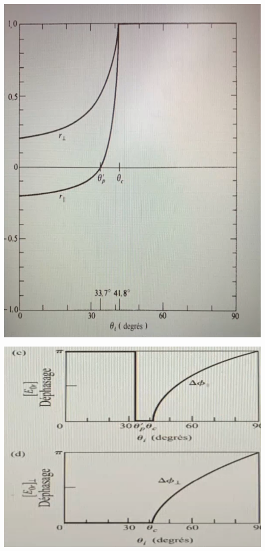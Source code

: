 \documentclass[12pt]{book}
\begin{document}
                \begin{center}
                    \begin{minipage}{0.3\linewidth}
                        \includegraphics[width =\linewidth]{pic/graphe3.png}
                    \end{minipage}
                    \begin{minipage}{0.49\linewidth}
                        \includegraphics[width = \linewidth]{pic/graphe4.png}
                    \end{minipage}
                \end{center}
\end{document}
